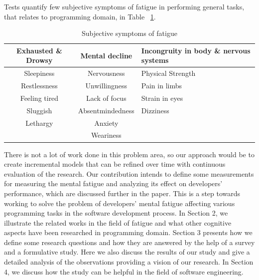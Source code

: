 \documentclass{acm_proc_article-sp}
\begin{document}
Tests \cite{saito:industry} quantify few subjective symptoms of fatigue in
performing general tasks, that relates to programming domain, in Table
~\ref{table:symptoms}.

	\begin{table}
		\centering
		\caption{Subjective symptoms of fatigue}
		\begin{tabular}{|c|c|l|} \hline
			\textbf{Exhausted \& Drowsy} & \textbf{Mental decline} & \textbf{Incongruity
			in body \& nervous systems}\\ \hline
			Sleepiness&Nervousness&Physical Strength\\ \hline
			Restlessness&Unwillingness&Pain in limbs\\ \hline
			Feeling tired&Lack of focus&Strain in eyes\\ \hline
			Sluggish&Absentmindedness&Dizziness\\ \hline
			Lethargy&Anxiety& \\ \hline
			 &Weariness& \\ \hline		
			\end{tabular}
		\label{table:symptoms}
	\end{table}

There is not a lot of work done in this problem area, so our approach would be
to create incremental models that can be refined over time with continuous
evaluation of the research. Our contribution intends to define some measurements
for measuring the mental fatigue and analyzing its effect on developers'
performance, which are discussed further in the paper. This is a step towards
working to solve the problem of developers' mental fatigue affecting various
programming tasks in the software development process. In Section 2, we
illustrate the related works in the field of fatigue and what other cognitive
aspects have been researched in programming domain. Section 3 presents how
we define some research questions and how they are answered by the help
of a survey and a formulative study. Here we also discuss the results of our
study and give a detailed analysis of the observations providing a vision of our
research. In Section 4, we discuss how the study can be helpful in the field
of software engineering.
\end{document}
